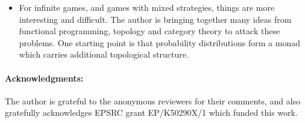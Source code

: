 \documentclass{article}
\begin{document}
\begin{itemize}
\item For infinite games, and games with mixed strategies, things are more interesting and difficult. The author is bringing together many ideas from functional programming, topology and category theory to attack these problems. One starting point is that probability distributions form a monad \citep{giry82, erwig06} which carries additional topological structure.
\end{itemize}

\paragraph{Acknowledgments:}
The author is grateful to the anonymous reviewers for their comments, and also gratefully acknowledges EPSRC grant EP/K50290X/1 which funded this work.



\end{document}
